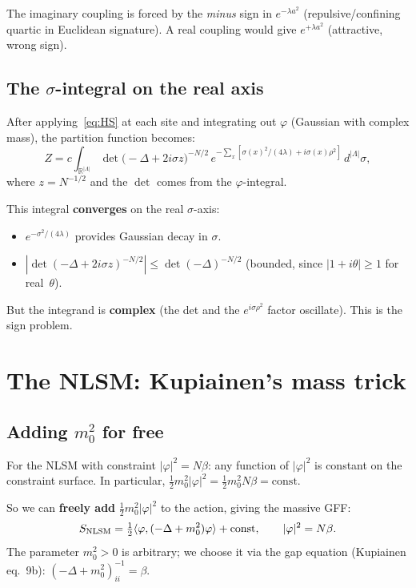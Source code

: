 \documentclass[12pt]{article}
\theoremstyle{definition}
\theoremstyle{remark}
\newcommand{\R}{\mathbb{R}}
\newcommand{\ph}{\varphi}
\newcommand{\La}{\Lambda}
\begin{document}
The imaginary coupling is forced by the \emph{minus} sign in
$e^{-\lambda a^2}$ (repulsive/confining quartic in Euclidean
signature). A real coupling would give $e^{+\lambda a^2}$
(attractive, wrong sign).

\subsection{The $\sigma$-integral on the real axis}

After applying~\eqref{eq:HS} at each site and integrating out $\ph$
(Gaussian with complex mass), the partition function becomes:
\begin{equation}
\label{eq:f}
  Z = c\!\int_{\R^{|\La|}}\!
    \det\bigl(-\Delta + 2i\sigma z\bigr)^{-N/2}\,
    e^{-\sum_x[\sigma(x)^2/(4\lambda)+i\sigma(x)\rho^2]}\,
    d^{|\La|}\sigma,
\end{equation}
where $z = N^{-1/2}$ and the $\det$ comes from the $\ph$-integral.

This integral \textbf{converges} on the real $\sigma$-axis:
\begin{itemize}
\item $e^{-\sigma^2/(4\lambda)}$ provides Gaussian decay in $\sigma$.
\item $|\det(-\Delta+2i\sigma z)^{-N/2}|
  \le \det(-\Delta)^{-N/2}$ (bounded, since $|1+i\theta| \ge 1$
  for real~$\theta$).
\end{itemize}
But the integrand is \textbf{complex} (the det and the $e^{i\sigma \rho^2}$
factor oscillate). This is the sign problem.

\section{The NLSM: Kupiainen's mass trick}

\subsection{Adding $m_0^2$ for free}

For the NLSM with constraint $|\ph|^2 = N\beta$: any function of
$|\ph|^2$ is constant on the constraint surface. In particular,
$\tfrac{1}{2}m_0^2|\ph|^2 = \tfrac{1}{2}m_0^2 N\beta = \text{const}$.

So we can \textbf{freely add} $\tfrac{1}{2}m_0^2|\ph|^2$ to the
action, giving the massive GFF:
\begin{equation}
  S_{\rm NLSM} = \tfrac{1}{2}\langle\ph,(-\Delta+m_0^2)\ph\rangle
    + \text{const},
  \qquad |\ph|^2 = N\beta.
\end{equation}
The parameter $m_0^2 > 0$ is arbitrary; we choose it via the gap
equation (Kupiainen eq.~9b):
$(-\Delta+m_0^2)^{-1}_{ii} = \beta$.
\end{document}
